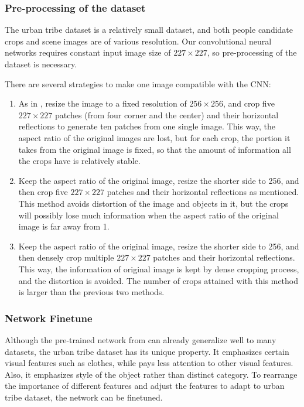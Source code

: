 \documentclass[10pt,twocolumn,letterpaper]{article}
\begin{document}
\subsubsection{Pre-processing of the dataset}
\label{sectioncropping}
The urban tribe dataset is a relatively small dataset, and both people candidate crops and scene images are of various resolution. Our convolutional neural networks requires constant input image size of $227\times227$, so pre-processing of the dataset is necessary. 

There are several strategies to make one image compatible with the CNN:

\begin{enumerate}
\item As in \cite{Imagenet}, resize the image to a fixed resolution of $256\times256$, and crop five $227 \times 227$ patches (from four corner and the center) and their horizontal reflections to generate ten patches from one single image. This way, the aspect ratio of the original images are lost, but for each crop, the portion it takes from the original image is fixed, so that the amount of information all the crops have is relatively stable.
\item Keep the aspect ratio of the original image, resize the shorter side to 256, and then crop five $227 \times 227$ patches and their horizontal reflections as mentioned. This method avoids distortion of the image and objects in it, but the crops will possibly lose much information when the aspect ratio of the original image is far away from 1.
\item Keep the aspect ratio of the original image, resize the shorter side to 256, and then densely crop multiple $227 \times 227$ patches and their horizontal reflections. This way, the information of original image is kept by dense cropping process, and the distortion is avoided. The number of crops attained with this method is larger than the previous two methods.
\end{enumerate}

\subsubsection{Network Finetune}
Although the pre-trained network from \cite{caffe} can already generalize well to many datasets, the urban tribe dataset has its unique property. It emphasizes certain visual features such as clothes, while pays less attention to other visual features. Also, it emphasizes style of the object rather than distinct category. To rearrange the importance of different features and adjust the features to adapt to urban tribe dataset, the network can be finetuned. 
\end{document}
